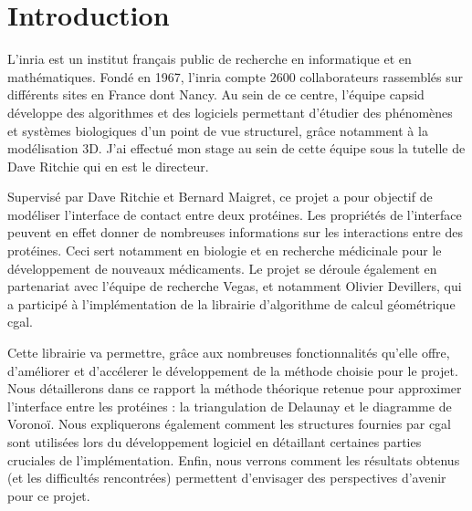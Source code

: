 \chapter*{Introduction}

  L'\gls{inria} est un
  institut français public de recherche en informatique et en mathématiques. Fondé
  en 1967, l'\gls{inria} compte 2600 collaborateurs rassemblés sur différents sites en
  France dont Nancy. Au sein de ce centre, l'équipe \gls{capsid} développe des algorithmes
  et des logiciels permettant d'étudier des phénomènes et systèmes biologiques
  d'un point de vue structurel, grâce notamment à la modélisation 3D. J'ai effectué
  mon stage au sein de cette équipe sous la tutelle de Dave Ritchie qui en est le
  directeur.

  Supervisé par Dave Ritchie et Bernard Maigret, ce projet a pour objectif de
  modéliser l'interface de contact entre deux protéines. Les propriétés de l'interface
  peuvent en effet donner de nombreuses informations sur les interactions entre
  des protéines. Ceci sert notamment en biologie et en recherche médicinale pour
  le développement de nouveaux médicaments.
  Le projet se déroule également en partenariat avec l'équipe de recherche Vegas, et
  notamment Olivier Devillers, qui a participé à l'implémentation de
  la librairie d'algorithme de calcul géométrique \gls{cgal}.

  Cette librairie va permettre, grâce aux nombreuses fonctionnalités qu'elle offre,
  d'améliorer et d'accélerer le développement de la méthode choisie pour le projet.
  Nous détaillerons dans ce rapport la méthode théorique retenue pour approximer l'interface
  entre les protéines : la triangulation de Delaunay et le diagramme de Voronoï. Nous
  expliquerons également comment les structures fournies par \gls{cgal} sont utilisées lors
  du développement logiciel en détaillant certaines parties cruciales de l'implémentation.
  Enfin, nous verrons comment les résultats obtenus (et les difficultés rencontrées)
  permettent d'envisager des perspectives d'avenir pour ce projet.
